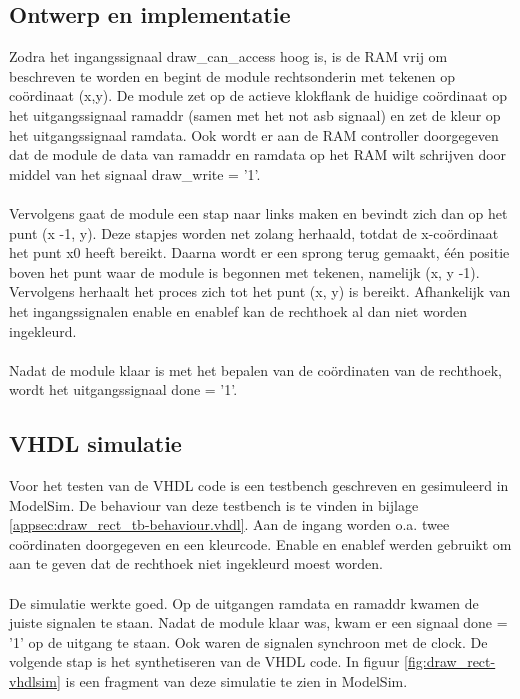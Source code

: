 \documentclass{scrartcl} %
\begin{document}
\subsection{Ontwerp en implementatie}
Zodra het ingangssignaal draw\_can\_access hoog is, is de RAM vrij om beschreven te worden en begint de module rechtsonderin met tekenen op coördinaat (x,y). De module zet op de actieve klokflank de huidige coördinaat op het uitgangssignaal ramaddr (samen met het not asb signaal) en zet de kleur op het uitgangssignaal ramdata. Ook wordt er aan de RAM controller doorgegeven dat de module de data van ramaddr en ramdata op het RAM wilt schrijven door middel van het signaal draw\_write = '1'.
\\\\
Vervolgens gaat de module een stap naar links maken en bevindt zich dan op het punt (x -1, y). Deze stapjes worden net zolang herhaald, totdat de x-coördinaat het punt x0 heeft bereikt. Daarna wordt er een sprong terug gemaakt, één positie boven het punt waar de module is begonnen met tekenen, namelijk (x, y -1). Vervolgens herhaalt het proces zich tot het punt (x, y) is bereikt. Afhankelijk van het ingangssignalen enable en enablef kan de rechthoek al dan niet worden ingekleurd.
\\\\
Nadat de module klaar is met het bepalen van de coördinaten van de rechthoek, wordt het uitgangssignaal done = '1'.

\subsection{VHDL simulatie}
Voor het testen van de VHDL code is een testbench geschreven en gesimuleerd in ModelSim. De behaviour van deze testbench is te vinden in bijlage \ref{appsec:draw_rect_tb-behaviour.vhdl}. Aan de ingang worden o.a. twee coördinaten doorgegeven en een kleurcode. Enable en enablef werden gebruikt om aan te geven dat de rechthoek niet ingekleurd moest worden.
\\\\
De simulatie werkte goed. Op de uitgangen ramdata en ramaddr kwamen de juiste signalen te staan. Nadat de module klaar was, kwam er een signaal done = '1' op de uitgang te staan. Ook waren de signalen synchroon met de clock. De volgende stap is het synthetiseren van de VHDL code. In figuur \ref{fig:draw_rect-vhdlsim} is een fragment van deze simulatie te zien in ModelSim.
\\\\
\end{document}
